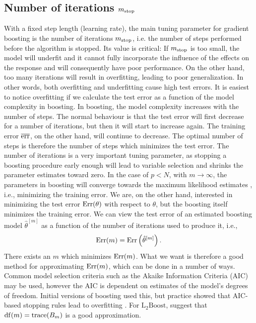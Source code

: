 \subsection{Number of iterations $m_{\text{stop}}$}
\label{sec:stop}
With a fixed step length (learning rate), the main tuning parameter for gradient boosting is the number of iterations $m_{\text{stop}}$, i.e. the number of steps performed before the algorithm is stopped.
Its value is critical:
If $m_{\text{stop}}$ is too small, the model will underfit and it cannot fully incorporate the influence of the effects on the response and will consequently have poor performance.
On the other hand, too many iterations will result in overfitting, leading to poor generalization.
In other words, both overfitting and underfitting cause high test errors.
It is easiest to notice overfitting if we calculate the test error as a function of the model complexity in boosting.
In boosting, the model complexity increases with the number of steps.
The normal behaviour is that the test error will first decrease for a number of iterations, but then it will start to increase again.
The training error $\overline{\text{err}}$, on the other hand, will continue to decrease.
The optimal number of steps is therefore the number of steps which minimizes the test error.
The number of iterations is a very important tuning parameter, as stopping a boosting procedure early enough will lead to variable selection and shrinks the parameter estimates toward zero.
In the case of $p<N$, with $m\to\infty$, the parameters in boosting will converge towards the maximum likelihood estimates \citep{DeBin2016}, i.e., minimizing the training error.
We are, on the other hand, interested in minimizing the test error $\text{Err}(\theta)$ with respect to $\theta$, but the boosting itself minimizes the training error.
We can view the test error of an estimated boosting model $\hat{\theta}^{[m]}$ as a function of the number of iterations used to produce it, i.e.,
\begin{equation}\label{test-error-m}
    \text{Err}(m)=\text{Err}\left(\hat{\theta}^{[m]}\right).
\end{equation}
There exists an $m$ which minimizes $\text{Err}(m)$.
What we want is therefore a good method for approximating $\text{Err}(m)$, which can be done in a number of ways.
Common model selection criteria such as the Akaike Information Criteria (AIC) may be used, however the AIC is dependent on estimates of the model's degrees of freedom. 
Initial versions of boosting used this, but practice showed that AIC-based stopping rules lead to overfitting \citep{mayr-hofner}.
For $\text{L}_2\text{Boost}$, \citet{buhlmann2007} suggest that $\operatorname{df}(m)=\operatorname{trace}(B_m)$ is a good approximation.

